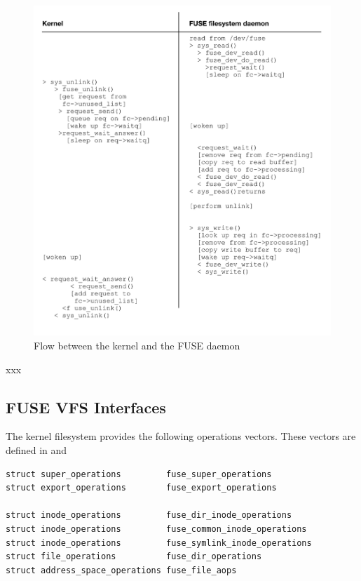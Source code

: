 \begin{figure}
	\includegraphics[scale=0.7]{figures/fuse-flow-to-daemon.pdf}
	\centering
	\caption{Flow between the kernel and the FUSE daemon}
	\label{fig:fuse-flow-to-daemon}
\end{figure}

\noindent
xxx


\subsection{FUSE VFS Interfaces}

The  kernel filesystem provides the following operations vectors. These vectors are defined in  and 

\begin{lstlisting}
struct super_operations         fuse_super_operations
struct export_operations        fuse_export_operations

struct inode_operations         fuse_dir_inode_operations
struct inode_operations         fuse_common_inode_operations
struct inode_operations         fuse_symlink_inode_operations 
struct file_operations          fuse_dir_operations
struct address_space_operations fuse_file_aops
\end{lstlisting}

